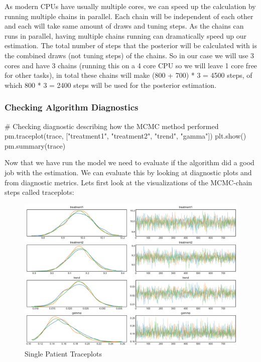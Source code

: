 \documentclass[12pt,a4paper,leqno]{report}
\theoremstyle{plain}
\theoremstyle{definition}
\theoremstyle{remark}
\begin{document}
As modern CPUs have usually multiple cores, we can speed up the calculation by running
multiple chains in parallel. Each chain will be independent of each other and each will
take same amount of draws and tuning steps. As the chains can runs in parallel, having
multiple chains running can dramatically speed up our estimation. The total number of steps that
the posterior will be calculated with is the combined draws (not tuning steps) of the
chains. So in our case we will use 3 cores and have 3 chains (running this on a 4 core
CPU so we will leave 1 core free for other tasks), in total these chains will make (800 +
700) * 3 = 4500 steps, of which 800 * 3 = 2400 steps will be used for the posterior estimation.

\subsubsection{Checking Algorithm Diagnostics}

\bigskip
\begin{pyverbatim}
# Checking diagnostic describing how the MCMC method performed
pm.traceplot(trace, ["treatment1", "treatment2", "trend", "gamma"])
plt.show()
pm.summary(trace)
\end{pyverbatim}
\bigskip

Now that we have run the model we need to evaluate if the algorithm did a good job with
the estimation. We can evaluate this by looking at diagnostic plots and from diagnostic
metrics. Lets first look at the visualizations of the MCMC-chain steps called traceplots:

\begin{figure}[H]
    \caption{Single Patient Traceplots}
    \label{traceplots}
    \includegraphics[width=\textwidth,height=\textheight,keepaspectratio]{single_patient_traceplot.pdf}
\end{figure}
\end{document}
